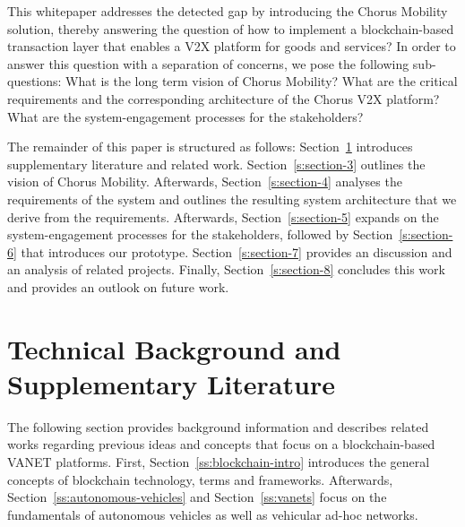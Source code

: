 \documentclass{llncs}
\begin{document}
{%





		This whitepaper addresses the detected gap by introducing the Chorus Mobility solution, thereby answering the question of how to implement a blockchain-based transaction layer that enables a V2X platform for goods and services? In order to answer this question with a separation of concerns, we pose the following sub-questions: What is the long term vision of Chorus Mobility? What are the critical requirements and the corresponding architecture of the Chorus V2X platform? What are the system-engagement processes for the stakeholders?

		The remainder of this paper is structured as follows: Section~\ref{s:section-2} introduces supplementary literature and related work. Section~\ref{s:section-3} outlines the vision of Chorus Mobility. Afterwards, Section~\ref{s:section-4} analyses the requirements of the system and outlines the resulting system architecture that we derive from the requirements. Afterwards, Section~\ref{s:section-5} expands on the system-engagement processes for the stakeholders, followed by Section~\ref{s:section-6} that introduces our prototype. Section~\ref{s:section-7} provides an discussion and an analysis of related projects. Finally, Section~\ref{s:section-8} concludes this work and provides an outlook on future work.



	\section{Technical Background and Supplementary Literature}	
		\label{s:section-2}
		
		The following section provides background information and describes related works regarding previous ideas and concepts that focus on a blockchain-based VANET platforms. First, Section~\ref{ss:blockchain-intro} introduces the general concepts of blockchain technology, terms and frameworks. Afterwards, Section~\ref{ss:autonomous-vehicles} and Section~\ref{ss:vanets} focus on the fundamentals of autonomous vehicles as well as vehicular ad-hoc networks. %
					
}
\end{document}
